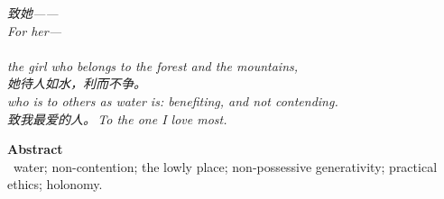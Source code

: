 \documentclass[11pt,a4paper]{article}
\begin{document}
\thispagestyle{empty}
\vspace*{4.5cm}
\begin{center}
\begin{minipage}{0.74\linewidth}
\centering\itshape\color{rose}
{\cjk 致她——}\\[0.3em]
For her---\\[0.7em]
\\[0.2em]
the girl who belongs to the forest and the mountains,\\[0.5em]
{\cjk 她待人如水，利而不争。}\\[0.2em]
who is to others as water is: benefiting, and not contending.\\[1.0em]
{\upshape\footnotesize\color{gold} {\cjk 致我最爱的人。}\,\;To the one I love most.}
\end{minipage}
\end{center}
\newpage

\thispagestyle{empty}
\noindent\textbf{\large\color{rosedeep} Abstract}\\[0.6em]


\vspace{1.2em}
\, \textcolor{inksoft}{water; non-contention; the lowly place; non-possessive generativity; practical ethics; holonomy.}
\newpage

\tableofcontents
\newpage



\printbibliography[heading=bibintoc]
\end{document}
